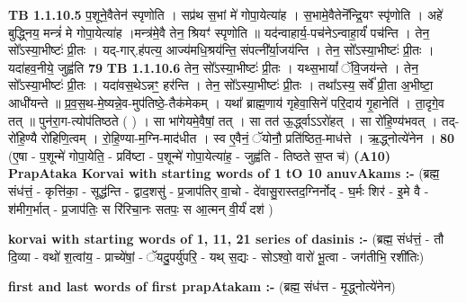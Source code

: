 \documentclass[17pt]{extarticle}
\begin{document}
                                \textbf{ TB 1.1.10.5} \newline
                  प॒शूने॒वैतेन॑ स्पृणोति । सप्र॑थ स॒भां मे॑ गोपा॒येत्या॑ह । स॒भामे॒वैतेनॆ᳚न्द्रि॒यꣳ स्पृ॑णोति । अहे॑ बुद्ध्निय॒ मन्त्रं॑ मे गोपा॒येत्या॑ह ।मन्त्र॑मे॒वै तेन॒ श्रियꣳ॑ स्पृणोति ॥ यद॑न्वाहार्य॒-पच॑नेऽन्वाहा॒र्यं॑ पच॑न्ति । तेन॒ सो᳚ऽस्या॒भीष्टः॑ प्री॒तः । यद्-गार्.ह॑पत्य॒ आज्य॑मधि॒श्रय॑न्ति॒ संपत्नी᳚र्या॒जय॑न्ति । तेन॒ सो᳚ऽस्या॒भीष्टः॑ प्री॒तः । यदा॑हव॒नीये॒ जुह्व॑ति \textbf{ 79} \newline
                  \newline
                                \textbf{ TB 1.1.10.6} \newline
                  तेन॒ सो᳚ऽस्या॒भीष्टः॑ प्री॒तः । यथ्स॒भायां᳚ ॅवि॒जय॑न्ते । तेन॒ सो᳚ऽस्या॒भीष्टः॑ प्री॒तः । यदा॑वस॒थेऽन्नꣳ॒॒ हर॑न्ति । तेन॒ सो᳚ऽस्या॒भीष्टः॑ प्री॒तः । तथा᳚ऽस्य॒ सर्वे᳚ प्री॒ता अ॒भीष्टा॒ आधी॑यन्ते ॥ प्र॒व॒स॒थ-मे॒ष्यन्ने॒व-मुप॑तिष्ठे॒-तैक॑मेकम् । यथा᳚ ब्राह्म॒णाय॑ गृहेवा॒सिने॑ परि॒दाय॑ गृ॒हानेति॑ । ता॒दृगे॒व तत् ॥ पुन॑रा॒ग-त्योप॑तिष्ठते ( ) । सा भा॑गेयमे॒वैषां॒ तत् । सा तत॑ ऊ॒र्द्ध्वाऽऽरो॑हत् । सा रो॑हि॒ण्य॑भवत् । तद्-रो॑हि॒ण्यै रो॑हिणि॒त्वम् । रो॒हि॒ण्या-म॒ग्नि-माद॑धीत । स्व ए॒वैनं॒ ॅयोनौ॒ प्रति॑ष्ठित॒-माध॑त्ते । ऋ॒द्ध्नोत्ये॑नेन । \textbf{ 80} \newline
                  \newline
                                    (ए॒षा - प॒शून्मे॑ गोपा॒येति॒ - प्रवि॑ष्टा - 
प॒शून्मे॑ गोपा॒येत्या॑ह॒ - जुह्व॑ति - तिष्ठते स॒प्त च॑) \textbf{(A10)} \newline \newline
                \textbf{PrapAtaka Korvai with starting  words of 1 tO 10 anuvAkams :-} \newline
        (ब्रह्म॒ संध॑त्तं॒ - कृत्ति॑का॒ - सूद्ध॑न्ति - द्वाद॒शसु॑ - प्र॒जाप॑तिर् वा॒चो - दे॑वासु॒रास्तद॒ग्निर्नोद् - घ॒र्मः शिर॑ - इ॒मे वै - श॑मीग॒र्भात् - प्र॒जाप॑तिः॒ स रि॑रिचा॒नः सतपः॒ स आ॒त्मन् वी॒र्यं॑ दश॑ ) \newline

        \textbf{korvai with starting words of 1, 11, 21 series of dasinis :-} \newline
        (ब्रह्म॒ संध॑त्तं॒ - तौ दि॒व्या - वथो॑ श॒त्वांय॒ - प्राच्ये॑षां॒ - ॅयदु॒पर्यु॑परि॒ - यथ् स॒द्यः - सोऽश्वो॒ वारो॑ भू॒त्वा - जग॑तीभि॒ रशी॑तिः) \newline

        \textbf{first and last  words of first prapAtakam :-} \newline
        (ब्रह्म॒ संध॑त्त - मृ॒द्ध्नोत्ये॑नेन) \newline 
\end{document}
